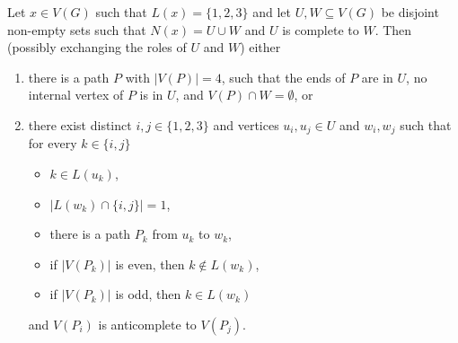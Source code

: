 \documentclass[11pt]{article}
\begin{document}
\begin{claim}\label{clm:Kempe}
Let $x \in V(G)$ such that $L(x)=\{1,2,3\}$ and let $U,W \subseteq V(G)$ be disjoint non-empty sets such that $N(x)= U \cup W$ and $U$ is complete to $W$. 
Then (possibly exchanging the roles of $U$ and $W$) either
\begin{enumerate}
\item there is a path $P$ with $|V(P)|=4$, such that 
the ends of $P$ are in $U$, no internal vertex of $P$ is in $U$, and 
$V(P) \cap W=\emptyset$, or
\item there exist distinct $i,j \in \{1,2,3\}$ 
and vertices $u_i,u_j \in U$ and $w_i, w_j$ such that for every
$k \in \{i,j\}$ 
\begin{itemize}
\item $k \in L(u_k)$, 
\item $|L(w_k) \cap \{i,j\}|=1$, 
\item there is a path $P_k$ from $u_k$ to $w_k$, 
\item if $|V(P_k)|$ is even, then $k \not \in L(w_k)$,
\item if $|V(P_k)|$ is odd, then $k \in L(w_k)$ 
\end{itemize}
and $V(P_i)$ is anticomplete to $V(P_j)$.
\end{enumerate}
\end{claim} 
\end{document}
